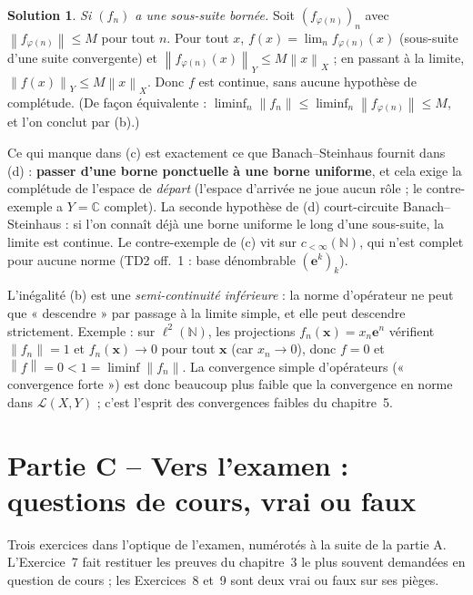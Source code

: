 \documentclass[11pt,a4paper]{article}
\newcommand{\N}{\mathbb{N}}
\newcommand{\C}{\mathbb{C}}
\newcommand{\norm}[1]{\left\|#1\right\|}
\newcommand{\Lc}{\mathcal{L}}
\theoremstyle{definition}
\newtheorem*{solution}{Solution}
\begin{document}
\begin{solution}
\emph{Si $(f_n)$ a une sous-suite bornée.} Soit $(f_{\varphi(n)})_n$ avec $\norm{f_{\varphi(n)}}\le M$ pour tout $n$. Pour tout $x$, $f(x)=\lim_nf_{\varphi(n)}(x)$ (sous-suite d'une suite convergente) et $\norm{f_{\varphi(n)}(x)}_Y\le M\norm x_X$ ; en passant à la limite, $\norm{f(x)}_Y\le M\norm x_X$. Donc $f$ est continue, sans aucune hypothèse de complétude. (De façon équivalente : $\liminf_n\norm{f_n}\le\liminf_n\norm{f_{\varphi(n)}}\le M$, et l'on conclut par (b).)
\end{solution}

\begin{pointcle}
Ce qui manque dans (c) est exactement ce que Banach--Steinhaus fournit dans (d) : \textbf{passer d'une borne ponctuelle à une borne uniforme}, et cela exige la complétude de l'espace de \emph{départ} (l'espace d'arrivée ne joue aucun rôle ; le contre-exemple a $Y=\C$ complet). La seconde hypothèse de (d) court-circuite Banach--Steinhaus : si l'on connaît déjà une borne uniforme le long d'une sous-suite, la limite est continue. Le contre-exemple de (c) vit sur $c_{<\infty}(\N)$, qui n'est complet pour aucune norme (TD2 off.~1 : base dénombrable $(\mathbf e^k)_k$).
\end{pointcle}

\begin{commentaire}
L'inégalité (b) est une \emph{semi-continuité inférieure} : la norme d'opérateur ne peut que « descendre » par passage à la limite simple, et elle peut descendre strictement. Exemple : sur $\ell^2(\N)$, les projections $f_n(\mathbf x)=x_n\mathbf e^n$ vérifient $\norm{f_n}=1$ et $f_n(\mathbf x)\to0$ pour tout $\mathbf x$ (car $x_n\to0$), donc $f=0$ et $\norm f=0<1=\liminf\norm{f_n}$. La convergence simple d'opérateurs (« convergence forte ») est donc beaucoup plus faible que la convergence en norme dans $\Lc(X,Y)$ ; c'est l'esprit des convergences faibles du chapitre~5.
\end{commentaire}

\section*{Partie C -- Vers l'examen : questions de cours, vrai ou faux}

\begin{commentaire}
Trois exercices dans l'optique de l'examen, numérotés à la suite de la partie A. L'Exercice~7 fait restituer les preuves du chapitre~3 le plus souvent demandées en question de cours ; les Exercices~8 et~9 sont deux vrai ou faux sur ses pièges.
\end{commentaire}
\end{document}
